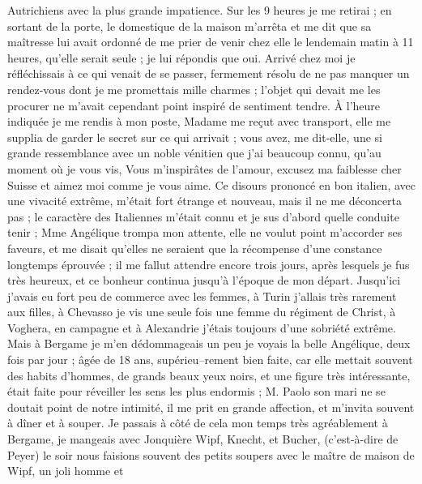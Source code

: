 \documentclass[12pt]{article}
\begin{document}
 Autrichiens avec la plus grande impatience. Sur
les 9 heures je me retirai ; en sortant de la porte, le domestique de la maison m’arrêta et me dit
que sa maîtresse lui avait ordonné de me prier de venir chez elle le lendemain matin à 11 heures,
qu’elle serait seule ; je lui répondis que oui. Arrivé chez moi je réfléchissais à ce qui venait de
se passer, fermement résolu de ne pas manquer un rendez-vous dont je me promettais mille charmes ;
l’objet qui devait me les procurer ne m’avait cependant point inspiré de sentiment tendre. À l’heure
indiquée je me rendis à mon poste, Madame me reçut avec transport, elle me supplia de garder le
secret sur ce qui arrivait ; vous avez, me dit-elle, une si grande ressemblance avec un noble
vénitien que j’ai beaucoup connu, qu’au moment où je vous vis, Vous m’inspirâtes de l’amour, excusez
ma faiblesse cher Suisse et aimez moi comme je vous aime. Ce disours prononcé en bon italien, avec
une vivacité extrême, m’était fort étrange et nouveau, mais il ne me déconcerta pas ; le caractère
des Italiennes m’était connu et je sus d’abord quelle conduite tenir ; Mme Angélique trompa mon
attente, elle ne voulut point m’accorder ses faveurs, et me disait qu’elles ne seraient que la
récompense d’une constance longtemps éprouvée ; il me fallut attendre encore trois jours, après
lesquels je fus très heureux, et ce bonheur continua jusqu’à l’époque de mon départ. Jusqu’ici
j’avais eu fort peu de commerce avec les femmes, à Turin j’allais très rarement aux filles, à
Chevasso je vis une seule fois une femme du régiment de Christ, à Voghera, en campagne et à
Alexandrie j’étais toujours d’une sobriété extrême. Mais à Bergame je m’en dédommageais un peu je
voyais la belle Angélique, deux fois par jour ; âgée de 18 ans, supérieu–rement bien faite, car elle
mettait souvent des habits d’hommes, de grands beaux yeux noirs, et une figure très intéressante,
était faite pour réveiller les sens les plus endormis ; M. Paolo son mari ne se doutait point de
notre intimité, il me prit en grande affection, et m’invita souvent à dîner et à souper. Je passais
à côté de cela mon temps très agréablement à Bergame, je mangeais avec Jonquière Wipf, Knecht, et
Bucher, (c’est-à-dire de Peyer) le soir nous faisions souvent des petits soupers avec le maître de
maison de Wipf, un joli homme et
\end{document}
